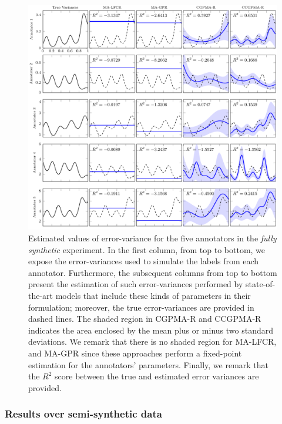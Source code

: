 \documentclass[9pt]{article}
\begin{document}
\begin{figure}[!tb]
	\centering
	\includegraphics[width = \textwidth]{Figures/VarEXp.pdf}
	\caption{Estimated values of error-variance for the five annotators in the \textit{fully synthetic} experiment. In the first column, from top to bottom, we expose the error-variances used to simulate the labels from each annotator. Furthermore, the subsequent columns from top to bottom present the estimation of such error-variances performed by state-of-the-art models that include these kinds of parameters in their formulation; moreover, the true error-variances are provided in dashed lines. The shaded region in CGPMA-R and CCGPMA-R indicates the area enclosed by the mean plus or minus two standard deviations. We remark that there is no shaded region for MA-LFCR, and MA-GPR since these approaches perform a fixed-point estimation for the annotators' parameters. Finally, we remark that the $R^2$ score between the true and estimated error variances are provided.}
	\label{fig:ExpReg}
\end{figure}

\subsubsection{Results over semi-synthetic data}
\end{document}
